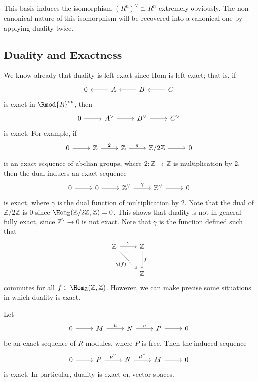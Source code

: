 This basis induces the isomorphism $\left( R^n \right)^{\vee} \cong R^n$ extremely obviously. The non-canonical nature of this isomorphism will be recovered into a canonical one by applying duality twice.

\subsection{Duality and Exactness}
We know already that duality is left-exact since Hom is left exact; that is, if
\[\begin{tikzcd}[row sep = 2.5em, column sep = 2.5em]
	0&A\arrow[l]&B\arrow[l]&C\arrow[l]
\end{tikzcd}\]
is exact in $\Rmod{R} ^{op} $, then
\[\begin{tikzcd}[row sep = 2.5em, column sep = 2.5em]
	0\arrow[r]&A^{\vee} \arrow[r]&B^{\vee} \arrow[r]&C^{\vee} 
\end{tikzcd}\]
is exact. For example, if
\[\begin{tikzcd}[row sep = 2.5em, column sep = 2.5em]
	0\arrow[r]&\mathbb{Z} \arrow[r, "2"]&\mathbb{Z} \arrow[r, "\pi "]&\mathbb{Z} /2\mathbb{Z} \arrow[r]&0
\end{tikzcd}\]
is an exact sequence of abelian groups, where $2: \mathbb{Z}  \to \mathbb{Z} $ is multiplication by 2, then the dual induces an exact sequence
\[\begin{tikzcd}[row sep = 2.5em, column sep = 2.5em]
	0\arrow[r]&0\arrow[r]&\mathbb{Z} ^{\vee} \arrow[r, "\gamma "]&\mathbb{Z} ^{\vee} \arrow[r]&0
\end{tikzcd}\]
is exact, where $\gamma $ is the dual function of multiplication by 2. Note that the dual of $\mathbb{Z} /2\mathbb{Z} $ is 0 since $\Hom_{\mathbb{Z} }(\mathbb{Z} /2\mathbb{Z} , \mathbb{Z} ) =0$. This shows that duality is not in general fully exact, since $\mathbb{Z} ^{\vee} \to 0$ is not exact. Note that $\gamma $ is the function defined such that
\[\begin{tikzcd}[row sep = 2.5em, column sep = 2.5em]
	\mathbb{Z} \arrow[r, "2"]\arrow[dr, "\gamma (f)"']&\mathbb{Z} \arrow[d, "f"]\\
							 &\mathbb{Z} 
\end{tikzcd}\]
commutes for all $f\in \Hom_{\mathbb{Z} }(\mathbb{Z} , \mathbb{Z} ) $. However, we can make precise some situations in which duality is exact.
\begin{proposition}\label{prp:8.7}
	Let
	\[\begin{tikzcd}[row sep = 2.5em, column sep = 2.5em]
		0\arrow[r]&M\arrow[r, "\mu "]&N\arrow[r, "\nu "]&P\arrow[r]&0
	\end{tikzcd}\]
	be an exact sequence of $R$-modules, where $P$ is free. Then the induced sequence
	\[\begin{tikzcd}[row sep = 2.5em, column sep = 2.5em]
		0\arrow[r]&P\arrow[r, "\nu^{\vee} "]&N\arrow[r, "\mu ^{\vee} "]&M\arrow[r]&0
	\end{tikzcd}\]
	is exact. In particular, duality is exact on vector spaces.
\end{proposition}

